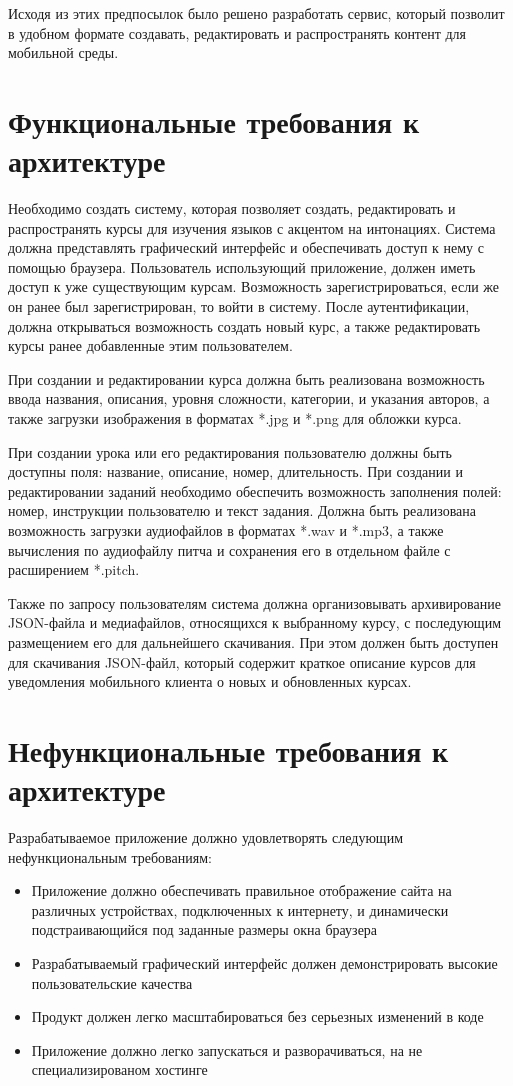 \documentclass[%
  a5paper,
  subf,
  href,
  master,
  dotsinheaders 
]{csse-fcs}
\begin{document}
Исходя из этих предпосылок было решено разработать сервис, который позволит в удобном формате создавать, редактировать и распространять контент для мобильной среды.


\section{Функциональные требования к архитектуре}

Необходимо создать систему, которая позволяет создать, редактировать и распространять курсы для изучения языков с акцентом на интонациях. Система должна представлять графический интерфейс и обеспечивать доступ к нему с помощью браузера. Пользователь использующий приложение, должен иметь доступ к уже существующим курсам. Возможность зарегистрироваться, если же он ранее был зарегистрирован, то войти в систему. После аутентификации, должна открываться возможность создать новый курс, а также редактировать курсы ранее добавленные этим пользователем.


При создании и редактировании курса должна быть реализована возможность ввода названия, описания, уровня сложности, категории, и указания авторов, а также загрузки изображения в форматах *.jpg и *.png для обложки курса.

При создании урока или его редактирования пользователю должны быть доступны поля: название, описание, номер, длительность.
При создании и редактировании заданий необходимо обеспечить возможность заполнения полей: 
номер, инструкции пользователю и текст задания. Должна быть реализована возможность загрузки аудиофайлов в форматах *.wav и *.mp3, а также вычисления по аудиофайлу питча и сохранения его в отдельном файле с расширением *.pitch.

Также по запросу пользователям система должна организовывать архивирование JSON-файла и медиафайлов, относящихся к выбранному курсу, с последующим размещением его для дальнейшего скачивания. При этом должен быть доступен для скачивания JSON-файл, который содержит краткое описание курсов для уведомления мобильного клиента о новых и обновленных курсах.

\section{Нефункциональные требования к архитектуре}

Разрабатываемое приложение должно удовлетворять следующим нефункциональным требованиям:

\begin{itemize}
	\item Приложение должно обеспечивать правильное отображение сайта на различных устройствах, подключенных к интернету, и динамически подстраивающийся под заданные размеры окна браузера
	\item Разрабатываемый графический интерфейс должен демонстрировать высокие пользовательские качества
	\item Продукт должен легко масштабироваться без серьезных изменений в коде 
	\item Приложение должно легко запускаться и разворачиваться, на не специализированом хостинге
\end{itemize}
\end{document}
